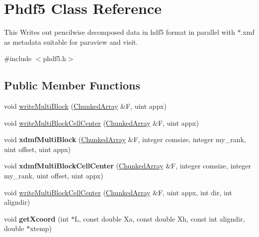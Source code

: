 \hypertarget{classPhdf5}{}\section{Phdf5 Class Reference}
\label{classPhdf5}


This Writes out pencilwise decomposed data in hdf5 format in parallel with $\ast$.xmf as metadata suitable for paraview and visit.  




{\ttfamily \#include $<$phdf5.\+h$>$}

\subsection*{Public Member Functions}
\begin{DoxyCompactItemize}
\item 
void \mbox{\hyperlink{classPhdf5_af7177501ea316b93ce36d928b620404b}{write\+Multi\+Block}} (\mbox{\hyperlink{classChunkedArray}{Chunked\+Array}} \&F, uint appx)
\item 
void \mbox{\hyperlink{classPhdf5_a18e7864449458697b3c15146c6a8e639}{write\+Multi\+Block\+Cell\+Center}} (\mbox{\hyperlink{classChunkedArray}{Chunked\+Array}} \&F, uint appx)
\item 
\mbox{\label{classPhdf5_a3f06e80f30b9c97d18348c6e90ef1a43}} 
void {\bfseries xdmf\+Multi\+Block} (\mbox{\hyperlink{classChunkedArray}{Chunked\+Array}} \&F, integer comsize, integer my\+\_\+rank, uint offset, uint appx)
\item 
\mbox{\label{classPhdf5_a066cabb2fe4aa5f1b2a28439162c0882}} 
void {\bfseries xdmf\+Multi\+Block\+Cell\+Center} (\mbox{\hyperlink{classChunkedArray}{Chunked\+Array}} \&F, integer comsize, integer my\+\_\+rank, uint offset, uint appx)
\item 
void \mbox{\hyperlink{classPhdf5_aa538a38bccf577015df490e3e2371445}{write\+Multi\+Block\+Cell\+Center}} (\mbox{\hyperlink{classChunkedArray}{Chunked\+Array}} \&F, uint appx, int dir, int aligndir)
\item 
\mbox{\label{classPhdf5_acb2924168ef005c803e8361bb4a8c465}} 
void {\bfseries get\+Xcoord} (int $\ast$L, const double Xa, const double Xh, const int aligndir, double $\ast$xtemp)
\item 
\mbox{\label{classPhdf5_a683af88ea2fd9f024a3d68e0843cc35c}} 

\end{DoxyCompactItemize}
